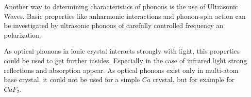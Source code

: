 Another way to determining characteristics of phonons is the use of Ultrasonic Waves.
Basic properties like anharmonic interactions and phonon-spin action can be investigated
by ultrasonic phonons of carefully controlled frequency an polarization.

As optical phonons in ionic crystal interacts strongly with light, this properties
could be used to get further insides. Especially in the case of infrared light
strong reflections and absorption appear. As optical phonons exist only in multi-atom
base crystal, it could not be used for a simple $Ca$ crystal, but for example for
$CaF_2$.